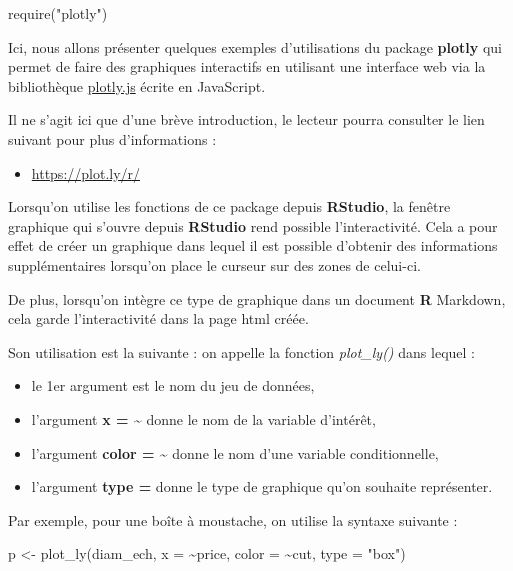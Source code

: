 \documentclass[
]{book}
\newenvironment{Shaded}{\begin{snugshade}}{\end{snugshade}}
\newcommand{\AttributeTok}[1]{\textcolor[rgb]{0.77,0.63,0.00}{#1}}
\newcommand{\FunctionTok}[1]{\textcolor[rgb]{0.00,0.00,0.00}{#1}}
\newcommand{\NormalTok}[1]{#1}
\newcommand{\OtherTok}[1]{\textcolor[rgb]{0.56,0.35,0.01}{#1}}
\newcommand{\SpecialCharTok}[1]{\textcolor[rgb]{0.00,0.00,0.00}{#1}}
\newcommand{\StringTok}[1]{\textcolor[rgb]{0.31,0.60,0.02}{#1}}
\providecommand{\tightlist}{%
  \setlength{\itemsep}{0pt}\setlength{\parskip}{0pt}}
\theoremstyle{definition}
\theoremstyle{definition}
\theoremstyle{definition}
\theoremstyle{definition}
\theoremstyle{remark}
\begin{document}
\begin{Shaded}
\begin{Highlighting}[]
\FunctionTok{require}\NormalTok{(}\StringTok{"plotly"}\NormalTok{)}
\end{Highlighting}
\end{Shaded}

Ici, nous allons présenter quelques exemples d'utilisations du package \textbf{plotly} qui permet de faire des graphiques interactifs en utilisant une interface web via la bibliothèque \href{https://plot.ly/javascript/}{plotly.js} écrite en JavaScript.

Il ne s'agit ici que d'une brève introduction, le lecteur pourra consulter le lien suivant pour plus d'informations :

\begin{itemize}
\tightlist
\item
  \url{https://plot.ly/r/}
\end{itemize}

Lorsqu'on utilise les fonctions de ce package depuis \textbf{RStudio}, la fenêtre graphique qui s'ouvre depuis \textbf{RStudio} rend possible l'interactivité. Cela a pour effet de créer un graphique dans lequel il est possible d'obtenir des informations supplémentaires lorsqu'on place le curseur sur des zones de celui-ci.

De plus, lorsqu'on intègre ce type de graphique dans un document \textbf{R} Markdown, cela garde l'interactivité dans la page html créée.

Son utilisation est la suivante : on appelle la fonction \emph{plot\_ly()} dans lequel :

\begin{itemize}
\item
  le 1er argument est le nom du jeu de données,
\item
  l'argument \textbf{x = \textasciitilde{}} donne le nom de la variable d'intérêt,
\item
  l'argument \textbf{color = \textasciitilde{}} donne le nom d'une variable conditionnelle,
\item
  l'argument \textbf{type =} donne le type de graphique qu'on souhaite représenter.
\end{itemize}

Par exemple, pour une boîte à moustache, on utilise la syntaxe suivante :

\begin{Shaded}
\begin{Highlighting}[]
\NormalTok{p }\OtherTok{\textless{}{-}} \FunctionTok{plot\_ly}\NormalTok{(diam\_ech, }\AttributeTok{x =} \SpecialCharTok{\textasciitilde{}}\NormalTok{price, }\AttributeTok{color =} \SpecialCharTok{\textasciitilde{}}\NormalTok{cut, }\AttributeTok{type =} \StringTok{"box"}\NormalTok{)}
\end{Highlighting}
\end{Shaded}
\end{document}
